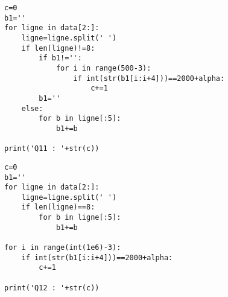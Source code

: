 \question{
}

\begin{lstlisting}
c=0
b1=''
for ligne in data[2:]:
    ligne=ligne.split(' ')
    if len(ligne)!=8:
        if b1!='':
            for i in range(500-3):
                if int(str(b1[i:i+4]))==2000+alpha:
                    c+=1
        b1=''
    else:
        for b in ligne[:5]:
            b1+=b
            
print('Q11 : '+str(c))
\end{lstlisting}

\question{
}

\begin{lstlisting}
c=0
b1=''
for ligne in data[2:]:
    ligne=ligne.split(' ')
    if len(ligne)==8:
        for b in ligne[:5]:
            b1+=b

for i in range(int(1e6)-3):
    if int(str(b1[i:i+4]))==2000+alpha:
        c+=1
        
print('Q12 : '+str(c))
\end{lstlisting}

